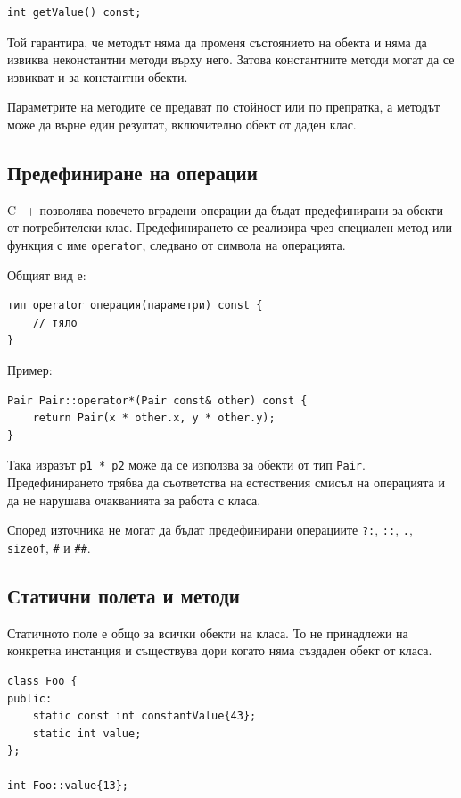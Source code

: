 \begin{verbatim}
int getValue() const;
\end{verbatim}

Той гарантира, че методът няма да променя състоянието на обекта и няма да извиква неконстантни методи върху него. Затова константните методи могат да се извикват и за константни обекти.

Параметрите на методите се предават по стойност или по препратка, а методът може да върне един резултат, включително обект от даден клас.

\subsection{Предефиниране на операции}\label{s:16.2.5}

C++ позволява повечето вградени операции да бъдат предефинирани за обекти от потребителски клас. Предефинирането се реализира чрез специален метод или функция с име \texttt{operator}, следвано от символа на операцията.

Общият вид е:

\begin{verbatim}
тип operator операция(параметри) const {
    // тяло
}
\end{verbatim}

Пример:

\begin{verbatim}
Pair Pair::operator*(Pair const& other) const {
    return Pair(x * other.x, y * other.y);
}
\end{verbatim}

Така изразът \texttt{p1 * p2} може да се използва за обекти от тип \texttt{Pair}. Предефинирането трябва да съответства на естествения смисъл на операцията и да не нарушава очакванията за работа с класа.

Според източника не могат да бъдат предефинирани операциите \texttt{?:}, \texttt{::}, \texttt{.}, \texttt{sizeof}, \texttt{\#} и \texttt{\#\#}.

\subsection{Статични полета и методи}\label{s:16.2.6}

Статичното поле е общо за всички обекти на класа. То не принадлежи на конкретна инстанция и съществува дори когато няма създаден обект от класа.

\begin{verbatim}
class Foo {
public:
    static const int constantValue{43};
    static int value;
};

int Foo::value{13};
\end{verbatim}

